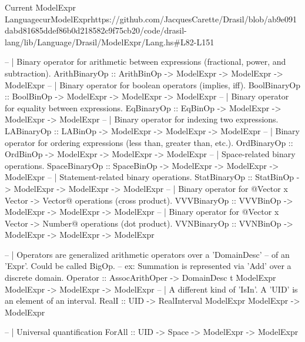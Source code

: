 \begin{haskell}{Current ModelExpr Language}{curModelExpr}{https://github.com/JacquesCarette/Drasil/blob/ab9e091dabd81685ddef86b0d218582c9f75cb20/code/drasil-lang/lib/Language/Drasil/ModelExpr/Lang.hs\#L82-L151}
  
  -- | Binary operator for arithmetic between expressions (fractional, power, and subtraction).
  ArithBinaryOp :: ArithBinOp -> ModelExpr -> ModelExpr -> ModelExpr
  -- | Binary operator for boolean operators (implies, iff).
  BoolBinaryOp  :: BoolBinOp -> ModelExpr -> ModelExpr -> ModelExpr
  -- | Binary operator for equality between expressions.
  EqBinaryOp    :: EqBinOp -> ModelExpr -> ModelExpr -> ModelExpr
  -- | Binary operator for indexing two expressions.
  LABinaryOp    :: LABinOp -> ModelExpr -> ModelExpr -> ModelExpr
  -- | Binary operator for ordering expressions (less than, greater than, etc.).
  OrdBinaryOp   :: OrdBinOp -> ModelExpr -> ModelExpr -> ModelExpr
  -- | Space-related binary operations.
  SpaceBinaryOp :: SpaceBinOp -> ModelExpr -> ModelExpr -> ModelExpr
  -- | Statement-related binary operations.
  StatBinaryOp  :: StatBinOp -> ModelExpr -> ModelExpr -> ModelExpr
  -- | Binary operator for @Vector x Vector -> Vector@ operations (cross product).
  VVVBinaryOp   :: VVVBinOp -> ModelExpr -> ModelExpr -> ModelExpr
  -- | Binary operator for @Vector x Vector -> Number@ operations (dot product).
  VVNBinaryOp   :: VVNBinOp -> ModelExpr -> ModelExpr -> ModelExpr
  
  
  -- | Operators are generalized arithmetic operators over a 'DomainDesc'
  --   of an 'Expr'.  Could be called BigOp.
  --   ex: Summation is represented via 'Add' over a discrete domain.
  Operator :: AssocArithOper -> DomainDesc t ModelExpr ModelExpr -> ModelExpr -> ModelExpr
  -- | A different kind of 'IsIn'. A 'UID' is an element of an interval.
  RealI    :: UID -> RealInterval ModelExpr ModelExpr -> ModelExpr
  
  -- | Universal quantification
  ForAll   :: UID -> Space -> ModelExpr -> ModelExpr
\end{haskell}
